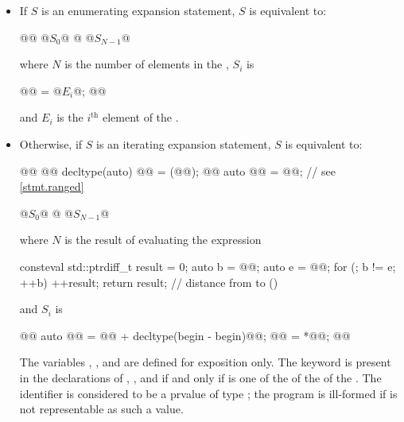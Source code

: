 \begin{itemize}
\item
If $S$ is an enumerating expansion statement, $S$ is equivalent to:
\begin{codeblock}
{
  @@
  @$S_{0}$@
  @\vdots@
  @$S_{N-1}$@
}
\end{codeblock}
where $N$ is the number of elements in the ,
$S_{i}$ is
\begin{codeblock}
{
  @@ = @$E_{i}$@;
  @@
}
\end{codeblock}
and $E_{i}$ is the $i^{\text{th}}$ element of the .

\item
Otherwise, if $S$ is an iterating expansion statement, $S$ is equivalent to:
\begin{codeblock}
{
  @@
  @@ decltype(auto) @@ = (@@);
  @@ auto @@ = @@;         // see \ref{stmt.ranged}

  @$S_{0}$@
  @\vdots@
  @$S_{N-1}$@
}
\end{codeblock}
where $N$ is the result of evaluating the expression
\begin{codeblock}
[&] consteval {
  std::ptrdiff_t result = 0;
  auto b = @@;
  auto e = @@;
  for (; b != e; ++b) ++result;
  return result;                                // distance from  to 
}()
\end{codeblock}
and $S_{i}$ is
\begin{codeblock}
{
  @@ auto @@ = @@ + decltype(begin - begin){@@};
  @@ = *@@;
  @@
}
\end{codeblock}
The variables , , and 
are defined for exposition only.
The keyword  is present in the declarations
of , , and 
if and only if
 is one of the  of
the  of
the .
The identifier  is considered to be
a prvalue of type ;
the program is ill-formed if
 is not representable as such a value.


\end{itemize}

